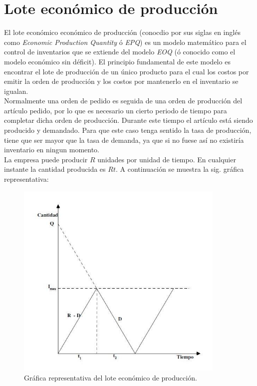 \documentclass[letterpaper, 12pt]{article}
\begin{document}
    \section{Lote económico de producción}
    \justify
    El lote económico económico de producción (conocdio por sus siglas en inglés como \emph{Economic Production Quantity} ó \emph{EPQ}) es un modelo matemático para el control de inventarios que se extiende del modelo \emph{EOQ} (ó conocido como el modelo económico
    sin déficit). El principio fundamental de este modelo es encontrar el lote de producción de un único producto para el cual los costos por emitir la orden de producción y los costos por mantenerlo en el inventario se igualan.
    \\\newline
    Normalmente una orden de pedido es seguida de una orden de producción del artículo pedido, por lo que es necesario un cierto periodo de tiempo para completar dicha orden de producción. Durante este tiempo el artículo está siendo producido y demandado. Para que este caso tenga sentido
    la tasa de producción, tiene que ser mayor que la tasa de demanda, ya que si no fuese así no existiría inventario en ningun momento.
    \\\newline
    La empresa puede producir \(R\) unidades por unidad de tiempo. En cualquier instante la cantidad producida es \(Rt\). A continuación se muestra la sig. gráfica representativa:
    \begin{figure}
        \centering
        \includegraphics[width=10cm]{LED.JPG}
        \caption{Gráfica representativa del lote económico de producción.}
    \end{figure}
\end{document}
